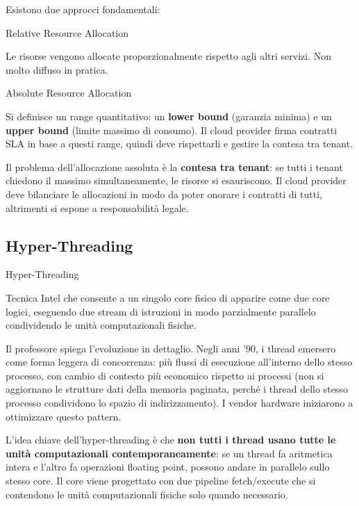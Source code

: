 \documentclass[
  italian,
  openany]{book}
\begin{document}
Esistono due approcci fondamentali:

\begin{calloutdefinition}{Relative Resource Allocation}

Le risorse vengono allocate proporzionalmente rispetto agli altri
servizi. Non molto diffuso in pratica.

\end{calloutdefinition}

\begin{calloutdefinition}{Absolute Resource Allocation}

Si definisce un range quantitativo: un \textbf{lower bound} (garanzia
minima) e un \textbf{upper bound} (limite massimo di consumo). Il cloud
provider firma contratti SLA in base a questi range, quindi deve
rispettarli e gestire la contesa tra tenant.

\end{calloutdefinition}

Il problema dell'allocazione assoluta è la \textbf{contesa tra tenant}:
se tutti i tenant chiedono il massimo simultaneamente, le risorse si
esauriscono. Il cloud provider deve bilanciare le allocazioni in modo da
poter onorare i contratti di tutti, altrimenti si espone a
responsabilità legale.

\subsection{Hyper-Threading}\label{hyper-threading}

\begin{calloutdefinition}{Hyper-Threading}

Tecnica Intel che consente a un singolo core fisico di apparire come due
core logici, eseguendo due stream di istruzioni in modo parzialmente
parallelo condividendo le unità computazionali fisiche.

\end{calloutdefinition}

Il professore spiega l'evoluzione in dettaglio. Negli anni '90, i thread
emersero come forma leggera di concorrenza: più flussi di esecuzione
all'interno dello stesso processo, con cambio di contesto più economico
rispetto ai processi (non si aggiornano le strutture dati della memoria
paginata, perché i thread dello stesso processo condividono lo spazio di
indirizzamento). I vendor hardware iniziarono a ottimizzare questo
pattern.

L'idea chiave dell'hyper-threading è che \textbf{non tutti i thread
usano tutte le unità computazionali contemporaneamente}: se un thread fa
aritmetica intera e l'altro fa operazioni floating point, possono andare
in parallelo sullo stesso core. Il core viene progettato con due
pipeline fetch/execute che si contendono le unità computazionali fisiche
solo quando necessario.
\end{document}
